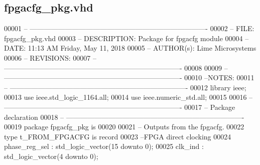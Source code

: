 \subsection{fpgacfg\+\_\+pkg.\+vhd}
\label{fpgacfg__pkg_8vhd_source}

\begin{DoxyCode}
00001 \textcolor{keyword}{-- ----------------------------------------------------------------------------}
00002 \textcolor{keyword}{-- FILE:          fpgacfg\_pkg.vhd}
00003 \textcolor{keyword}{-- DESCRIPTION:   Package for fpgacfg module}
00004 \textcolor{keyword}{-- DATE:          11:13 AM Friday, May 11, 2018}
00005 \textcolor{keyword}{-- AUTHOR(s):     Lime Microsystems}
00006 \textcolor{keyword}{-- REVISIONS:}
00007 \textcolor{keyword}{-- ----------------------------------------------------------------------------}
00008 
00009 \textcolor{keyword}{-- ----------------------------------------------------------------------------}
00010 \textcolor{keyword}{--NOTES:}
00011 \textcolor{keyword}{-- ----------------------------------------------------------------------------}
00012 \textcolor{vhdlkeyword}{library }\textcolor{keywordflow}{ieee};
00013 \textcolor{vhdlkeyword}{use }ieee.std\_logic\_1164.\textcolor{keywordflow}{all};
00014 \textcolor{vhdlkeyword}{use }ieee.numeric\_std.\textcolor{keywordflow}{all};
00015 
00016 \textcolor{keyword}{-- ----------------------------------------------------------------------------}
00017 \textcolor{keyword}{-- Package declaration}
00018 \textcolor{keyword}{-- ----------------------------------------------------------------------------}
00019 \textcolor{keywordflow}{package }fpgacfg_pkg \textcolor{keywordflow}{is}
00020    
00021 \textcolor{keyword}{   -- Outputs from the fpgacfg.}
00022    \textcolor{keywordflow}{type} \textcolor{vhdlchar}{t_FROM_FPGACFG} \textcolor{keywordflow}{is} \textcolor{keywordflow}{record}
00023 \textcolor{keyword}{      --FPGA direct clocking}
00024       \textcolor{vhdlchar}{phase_reg_sel}  \textcolor{vhdlchar}{:} \textcolor{comment}{std\_logic\_vector}\textcolor{vhdlchar}{(}\textcolor{vhdllogic}{}\textcolor{vhdllogic}{15} \textcolor{keywordflow}{downto} \textcolor{vhdllogic}{}\textcolor{vhdllogic}{0}\textcolor{vhdlchar}{)};
00025       \textcolor{vhdlchar}{clk_ind}        \textcolor{vhdlchar}{:} \textcolor{comment}{std\_logic\_vector}\textcolor{vhdlchar}{(}\textcolor{vhdllogic}{}\textcolor{vhdllogic}{4} \textcolor{keywordflow}{downto} \textcolor{vhdllogic}{}\textcolor{vhdllogic}{0}\textcolor{vhdlchar}{)};

\end{DoxyCode}
